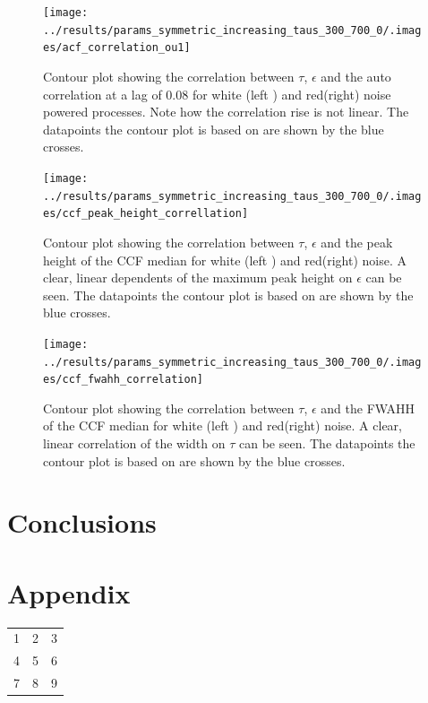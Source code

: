 \documentclass[a4paper,12pt]{book}
\theoremstyle{break}
\begin{document}
\begin{figure}[htp]
	\texttt{[image: ../results/params\_symmetric\_increasing\_taus\_300\_700\_0/.images/acf\_correlation\_ou1]}%
	\caption{Contour plot showing the correlation between $\tau$, $\epsilon$ and the auto correlation at a lag of 0.08 for white (left ) and red(right) noise powered processes. Note how the correlation rise is not linear. The datapoints  the contour plot is based on are shown by the blue crosses.}%
	\label{f/r/acf_white_sym_correlation}%
\end{figure}

\begin{figure}[htp]
	\texttt{[image: ../results/params\_symmetric\_increasing\_taus\_300\_700\_0/.images/ccf\_peak\_height\_correllation]}%
	\caption{Contour plot showing the correlation between $\tau$, $\epsilon$ and the peak height of the CCF median for white (left ) and red(right) noise. A clear, linear dependents of the maximum peak height on $\epsilon$ can be seen. The datapoints  the contour plot is based on are shown by the blue crosses.}%
	\label{f/r/ccf_white_sym_correlation_height}
\end{figure}

\begin{figure}[htp]
	\texttt{[image: ../results/params\_symmetric\_increasing\_taus\_300\_700\_0/.images/ccf\_fwahh\_correlation]}%
	\caption{Contour plot showing the correlation between $\tau$, $\epsilon$ and the \ac{FWAHH} of the CCF median for white (left ) and red(right) noise. A clear, linear correlation of the width on $\tau$ can be seen. The datapoints  the contour plot is based on are shown by the blue crosses. }%
	\label{f/r/ccf_white_sym_correlation_width}
\end{figure}


\chapter{Conclusions}\label{ch/conclusion}

\chapter{Appendix}\label{ch/appendix}



\begin{tabular}{ l | c | r }\label{t/parameter}
	
	1 & 2 & 3 \\
	4 & 5 & 6 \\
	7 & 8 & 9 \\
	\hline  
\end{tabular}
\end{document}
